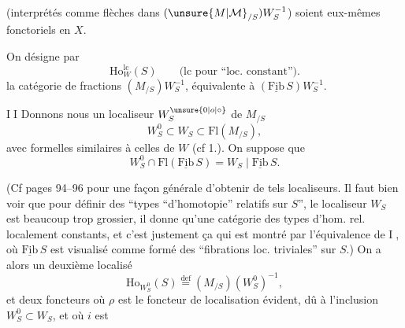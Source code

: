(interprétés comme flèches dans $(\unsure{M|\mathcal M}_{/S})W_S^{-1}$) soient eux-mêmes fonctoriels en $X$.

On désigne par
\[
\mathrm{Ho}_W^{\mathrm{lc}}(S)\qquad\text{(lc pour ``loc. constant'').}
\]
la catégorie de fractions $(M_{/S})W_S^{-1}$, équivalente à $(\underline{\mathrm{Fib}}\,S)W_S^{-1}$.

\textcircled{II} Donnons nous un localiseur $W_S^{\unsure{0|o|\circ}}$ de $M_{/S}$
\[
W_S^0\subset W_S\subset\mathrm{Fl}(M_{/S}),
\]
avec  formelles similaires à celles de $W$ (cf 1.). On suppose que
\[
W_S^0\cap\mathrm{Fl}(\underline{\mathrm{Fib}}\,S)=W_S\mid\underline{\mathrm{Fib}}\,S.\tag*{3°)}
\]

(Cf pages 94--96 pour une façon générale d'obtenir de tels localiseurs. Il faut bien voir que pour définir des ``types ``d'homotopie'' relatifs sur $S$'', le localiseur $W_S$ est beaucoup trop grossier,  il  donne qu'une catégorie des types d'hom. rel. localement constants, \unsure{\})} et c'est justement ça qui est montré par  l'équivalence de \textcircled{I}, où $\underline{\mathrm{Fib}}\,S$ est visualisé comme formé des ``fibrations loc. triviales'' sur $S$.)
On a alors un deuxième localisé
\[
\mathrm{Ho}_{W_S^0}(S)\overset{\mathrm{def}}{=}(M_{/S})(W_S^0)^{-1},
\]
et deux foncteurs
où $\rho$ est le foncteur de localisation  évident, dû à l'inclusion $W_S^0\subset W_S$, et où $i$ est
